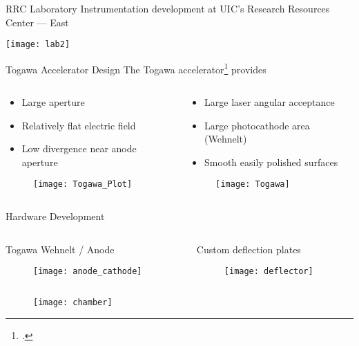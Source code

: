 \begin{frame}{RRC Laboratory}
  Instrumentation development at UIC's Research Resources Center --- East
  \begin{center}
    \texttt{[image: lab2]}
  \end{center}
\end{frame}

\begin{frame}{Togawa Accelerator Design}
  The Togawa accelerator\footcite{togawa_ceb6_2007} provides
  \begin{columns}
    \begin{column}{0.49\linewidth}
      \begin{itemize}
        \item<2-> Large aperture
        \item<3-> Relatively flat electric field
        \item<4-> Low divergence near anode aperture
      \end{itemize}
      \begin{figure}
        \centering
        \texttt{[image: Togawa\_Plot]}
      \end{figure}
    \end{column}
    \begin{column}{0.49\linewidth}
      \begin{itemize}
        \item<5-> Large laser angular acceptance
        \item<6-> Large photocathode area (Wehnelt)
        \item<7-> Smooth easily polished surfaces
      \end{itemize}
      \begin{figure}
        \centering
        \texttt{[image: Togawa]}
      \end{figure}
    \end{column}
  \end{columns}
\end{frame}

\begin{frame}{Hardware Development}
  \begin{columns}
    \begin{column}{0.49\linewidth}
      Togawa Wehnelt / Anode
      \begin{figure}
        \centering
        \texttt{[image: anode\_cathode]}
      \end{figure}
    \end{column}
    \begin{column}{0.49\linewidth}
      Custom deflection plates
      \begin{figure}
        \centering
        \texttt{[image: deflector]}
      \end{figure}
    \end{column}
  \end{columns}
  \begin{figure}
    \centering
    \texttt{[image: chamber]}
  \end{figure}
\end{frame}

